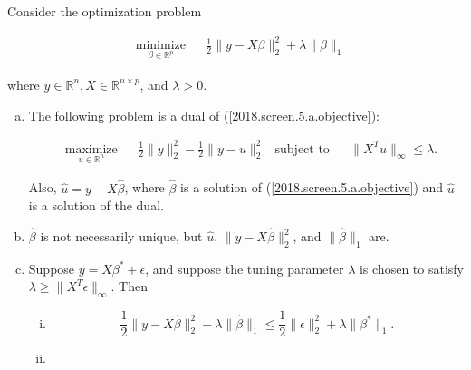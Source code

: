 \begin{proposition}\label{linreg.prop.2018.screen.5}

Consider the optimization problem 

\begin{equation}\label{2018.screen.5.a.objective}
\begin{aligned}
& \underset{\beta \in \mathbb{R}^p}{\text{minimize}}
& & \frac{1}{2} \lVert y - X \beta \rVert_2^2 + \lambda \lVert \beta \rVert_1
\end{aligned}
\end{equation}

where \(y \in \mathbb{R}^n, X \in \mathbb{R}^{n \times p}\), and \(\lambda > 0\). 

\begin{enumerate}[(a)]

\item The following problem is a dual of (\ref{2018.screen.5.a.objective}):

\[
\begin{aligned}
& \underset{u \in \mathbb{R}^n}{\text{maximize}}
& & \frac{1}{2} \lVert y  \rVert_2^2 - \frac{1}{2} \lVert y  - u \rVert_2^2 
& \text{subject to}
& & \lVert X^T u \rVert_\infty \leq \lambda.
\end{aligned}
\]

Also, \(\hat{u} = y - X \hat{\beta}\), where \(\hat{\beta}\) is a solution of (\ref{2018.screen.5.a.objective}) and \(\hat{u}\) is a solution of the dual.

\item \(\hat{\beta}\) is not necessarily unique, but \(\hat{u}\), \(\lVert y - X \hat{\beta} \rVert_2^2\), and \(\lVert \hat{\beta} \rVert_1\) are.

\item Suppose \(y = X \beta^* + \epsilon\), and suppose the tuning parameter \(\lambda\) is chosen to satisfy \(\lambda \geq \lVert X ^T \epsilon \rVert_\infty\). Then

\begin{enumerate}[(i)]

\item 

\[
\frac{1}{2} \lVert y - X \hat{\beta} \rVert_2^2 + \lambda \lVert \hat{\beta} \rVert_1 \leq \frac{1}{2} \lVert \epsilon \rVert_2^2 + \lambda \lVert \beta^* \rVert_1.
\]

\item 


\end{enumerate}
\end{enumerate}
\end{proposition}
